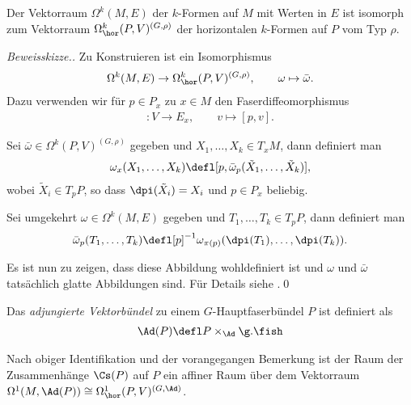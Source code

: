 \documentclass[%
	paper=a5,%
	fleqn,%
	DIV=18,%
	BCOR=0mm,
	fontsize=11pt,
	titlepage=false,%
	bibliography=totoc,
	DIV=18,%
	twoside=true,
	pdftitle=Riemannsche Geometrie,
	pdfauthor=Uwe Semmelmann,
	numbers=noendperiod]%
	{scrbook}
\begin{document}
\begin{prop}
\label{prop:Identifikation-E-Formen-auf-M}
Der Vektorraum
$\Omega^k(M,E)$ der $k$-Formen auf $M$ mit Werten in $E$ ist isomorph zum
Vektorraum $\Omega_\hor^k(P,V)^{(G,\rho)}$ der horizontalen $k$-Formen auf
$P$ vom Typ $\rho$.\fish
\end{prop}
\begin{proof}[Beweisskizze.]
Zu Konstruieren ist ein Isomorphismus
\begin{align*}
\Omega^k(M,E) \to \Omega_\hor^k(P,V)^{(G,\rho)},\qquad \omega\mapsto
\bar{\omega}.
\end{align*}
Dazu verwenden wir für $p\in P_x$ zu $x\in M$ den Faserdiffeomorphismus
\begin{align*}
[p]: V\to E_x,\qquad v\mapsto [p,v].
\end{align*}

Sei $\bar{\omega}\in \Omega^k(P,V)^{(G,\rho)}$ gegeben und $X_1,\ldots,X_k\in
T_xM$, dann definiert man
\begin{align*}
\omega_x(X_1,\ldots,X_k) \defl
[p,\bar{\omega}_p(\tilde{X}_1,\ldots,\tilde{X}_k)],
\end{align*}
wobei $\tilde{X}_i\in T_pP$, so dass $\dpi(\tilde{X}_i) = X_i$ und $p\in P_x$
beliebig.

Sei umgekehrt $\omega\in \Omega^k(M,E)$ gegeben und $T_1,\ldots,T_k\in T_pP$,
dann definiert man
\begin{align*}
\bar{\omega}_p(T_1,\ldots,T_k) \defl
[p]^{-1}\omega_{\pi(p)}(\dpi(T_1),\ldots,\dpi(T_k)).
\end{align*}

Es ist nun zu zeigen, dass diese Abbildung wohldefiniert ist und $\omega$ und
$\bar{\omega}$ tatsächlich glatte Abbildungen sind. Für Details siehe \cite[Satz
3.5]{Baum:2009wk}.\qed
\end{proof}

\begin{defn}
Das \emph{adjungierte Vektorbündel} zu einem $G$-Hauptfaserbündel $P$ ist
definiert als
\begin{align*}
\Ad(P) \defl P\times_\Ad \g.\fish
\end{align*}
\end{defn}

\begin{rem}
Nach obiger Identifikation und der vorangegangen Bemerkung ist der Raum der
Zusammenhänge $\Cs(P)$ auf $P$ ein affiner Raum über dem Vektorraum
$\Omega^1(M,\Ad(P))\cong \Omega^1_\hor(P,V)^{(G,\Ad)}$.\map
\end{rem}
\end{document}
